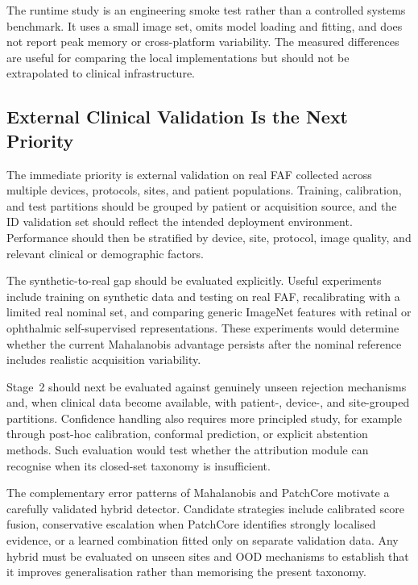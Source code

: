 \documentclass[fleqn,12pt]{olplainarticle}
\begin{document}
The runtime study is an engineering smoke test rather than a controlled
systems benchmark. It uses a small image set, omits model loading and fitting,
and does not report peak memory or cross-platform variability. The measured
differences are useful for comparing the local implementations but should not
be extrapolated to clinical infrastructure.

\subsection{External Clinical Validation Is the Next Priority}
\label{subsec:discussion_future_work}

The immediate priority is external validation on real FAF collected across
multiple devices, protocols, sites, and patient populations. Training,
calibration, and test partitions should be grouped by patient or acquisition
source, and the ID validation set should reflect the intended deployment
environment. Performance should then be stratified by device, site, protocol,
image quality, and relevant clinical or demographic factors.

The synthetic-to-real gap should be evaluated explicitly. Useful experiments
include training on synthetic data and testing on real FAF, recalibrating with
a limited real nominal set, and comparing generic ImageNet features with
retinal or ophthalmic self-supervised representations. These experiments
would determine whether the current Mahalanobis advantage persists after the
nominal reference includes realistic acquisition variability.

Stage~2 should next be evaluated against genuinely unseen rejection
mechanisms and, when clinical data become available, with patient-, device-,
and site-grouped partitions. Confidence handling also requires more principled
study, for example through post-hoc calibration, conformal prediction, or
explicit abstention methods. Such evaluation would test whether the
attribution module can recognise when its closed-set taxonomy is insufficient.

The complementary error patterns of Mahalanobis and PatchCore motivate a
carefully validated hybrid detector. Candidate strategies include calibrated
score fusion, conservative escalation when PatchCore identifies strongly
localised evidence, or a learned combination fitted only on separate
validation data. Any hybrid must be evaluated on unseen sites and OOD
mechanisms to establish that it improves generalisation rather than memorising
the present taxonomy.
\end{document}
